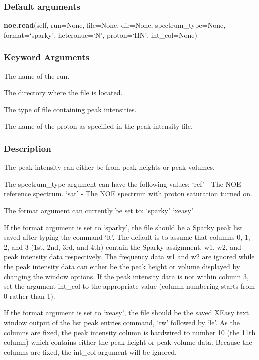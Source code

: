 \subsubsection{Default arguments}

\textsf{\textbf{noe.read}(self, run=None, file=None, dir=None, spectrum\_type=None, format=`sparky', heteronuc=`N', proton=`HN', int\_col=None)}


\subsubsection{Keyword Arguments}

  The name of the run.

  The directory where the file is located.

  The type of file containing peak intensities.

  The name of the proton as specified in the peak intensity file.


\subsubsection{Description}

The peak intensity can either be from peak heights or peak volumes.


The spectrum\_type argument can have the following values:
    `ref' - The NOE reference spectrum.
    `sat' - The NOE spectrum with proton saturation turned on.


The format argument can currently be set to:
    `sparky'
    `xeasy'

If the format argument is set to `sparky', the file should be a Sparky peak list saved after
typing the command `lt'.  The default is to assume that columns 0, 1, 2, and 3 (1st, 2nd,
3rd, and 4th) contain the Sparky assignment, w1, w2, and peak intensity data respectively.
The frequency data w1 and w2 are ignored while the peak intensity data can either be the
peak height or volume displayed by changing the window options.  If the peak intensity data
is not within column 3, set the argument int\_col to the appropriate value (column numbering
starts from 0 rather than 1).

If the format argument is set to `xeasy', the file should be the saved XEasy text window
output of the list peak entries command, `tw' followed by `le'.  As the columns are fixed,
the peak intensity column is hardwired to number 10 (the 11th column) which contains either
the peak height or peak volume data.  Because the columns are fixed, the int\_col argument
will be ignored.


